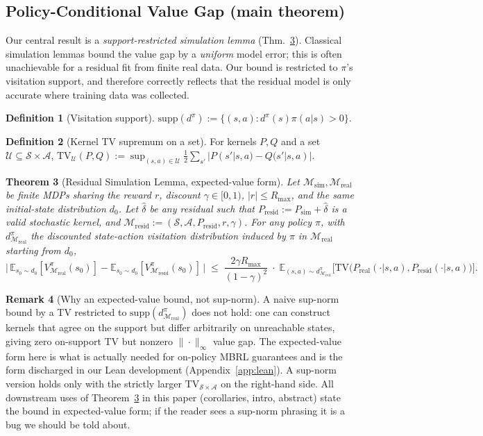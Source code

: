 \documentclass{article}
\newtheorem{theorem}{Theorem}
\theoremstyle{definition}
\newtheorem{definition}[theorem]{Definition}
\newtheorem{remark}[theorem]{Remark}
\newcommand{\Msim}{\mathcal{M}_{\mathrm{sim}}}
\newcommand{\Mreal}{\mathcal{M}_{\mathrm{real}}}
\newcommand{\Mresid}{\mathcal{M}_{\mathrm{resid}}}
\newcommand{\Psim}{P_{\mathrm{sim}}}
\newcommand{\Preal}{P_{\mathrm{real}}}
\newcommand{\Presid}{P_{\mathrm{resid}}}
\newcommand{\Rmax}{R_{\max}}
\newcommand{\supp}{\mathrm{supp}}
\newcommand{\Vpi}{V^{\pi}}
\newcommand{\dpi}{d^{\pi}}
\begin{document}
\subsection{Policy-Conditional Value Gap (main theorem)}

Our central result is a \emph{support-restricted simulation lemma}
(Thm.~\ref{thm:simulation}).  Classical simulation lemmas
\cite{kearns-singh-2002,ross-bagnell-2012} bound the value gap by a
\emph{uniform} model error; this is often unachievable for a residual
fit from finite real data.  Our bound is restricted to $\pi$'s
visitation support, and therefore correctly reflects that the residual
model is only accurate where training data was collected.

\begin{definition}[Visitation support]
$\supp(\dpi) := \{(s,a):\dpi(s)\pi(a|s) > 0\}$.
\end{definition}

\begin{definition}[Kernel TV supremum on a set]
For kernels $P,Q$ and a set $\mathcal U\subseteq\mathcal S\times\mathcal A$,
$\mathrm{TV}_{\mathcal U}(P,Q) := \sup_{(s,a)\in\mathcal U}\tfrac12\sum_{s'}|P(s'|s,a)-Q(s'|s,a)|$.
\end{definition}

\begin{theorem}[Residual Simulation Lemma, expected-value form]
\label{thm:simulation}
Let $\Msim,\Mreal$ be finite MDPs sharing the reward $r$, discount
$\gamma\in[0,1)$, $|r|\le\Rmax$, and the same initial-state distribution
$d_0$.  Let $\hat\delta$ be any residual such that
$\Presid := \Psim+\hat\delta$ is a valid stochastic kernel, and
$\Mresid := (\mathcal S,\mathcal A,\Presid,r,\gamma)$.  For any policy
$\pi$, with $\dpi_{\Mreal}$ the discounted state-action visitation
distribution induced by $\pi$ in $\Mreal$ starting from $d_0$,
\begin{equation}
\bigl|\,\mathbb E_{s_0\sim d_0}[\Vpi_{\Mreal}(s_0)]
   -    \mathbb E_{s_0\sim d_0}[\Vpi_{\Mresid}(s_0)]\,\bigr|
\;\le\;
\frac{2\gamma\Rmax}{(1-\gamma)^2}\;\cdot\;
\mathbb E_{(s,a)\sim\dpi_{\Mreal}}\!\bigl[\mathrm{TV}\bigl(\Preal(\cdot|s,a),\Presid(\cdot|s,a)\bigr)\bigr].
\label{eq:simulation}
\end{equation}
\end{theorem}

\begin{remark}[Why an expected-value bound, not sup-norm]
\label{rmk:no-supnorm}
A naive sup-norm bound by a TV restricted to $\supp(\dpi_{\Mreal})$ does
not hold: one can construct kernels that agree on the support but differ
arbitrarily on unreachable states, giving zero on-support TV but nonzero
$\|\cdot\|_\infty$ value gap.  The expected-value form here is what is
actually needed for on-policy MBRL guarantees and is the form discharged
in our Lean development (Appendix~\ref{app:lean}).  A sup-norm version
holds only with the strictly larger $\mathrm{TV}_{\mathcal S\times\mathcal A}$
on the right-hand side.  All downstream uses of
Theorem~\ref{thm:simulation} in this paper (corollaries, intro, abstract)
state the bound in expected-value form; if the reader sees a sup-norm
phrasing it is a bug we should be told about.
\end{remark}
\end{document}

